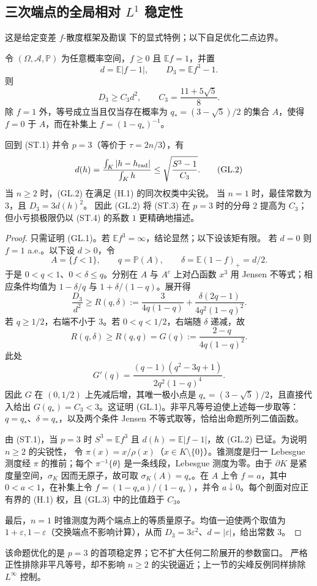 \subsection{三次端点的全局相对 \texorpdfstring{$L^1$}{L1} 稳定性}
\label{subsec:global-l1-cubic}

这是给定变差 $f$-散度框架及勘误
\cite{Gilardoni2006MinimumF,Gilardoni2010Corrigendum}下的显式特例；以下自足优化二点边界。

\begin{proposition}[三次矩的全局常数]\label{prop:global-l1-cubic}
令 $(\Omega,\mathcal A,\mathbb P)$ 为任意概率空间，$f\ge0$ 且
$\mathbb Ef=1$，并置
\[
 d=\mathbb E|f-1|,\qquad D_3=\mathbb Ef^3-1.
\]
则
\[
 D_3\ge C_3d^2,\qquad C_3=\frac{11+5\sqrt5}{8}.\tag{GL.1}
\]
除 $f=1$ 外，等号成立当且仅当存在概率为
\(q_*=(3-\sqrt5)/2\) 的集合 $A$，使得 $f=0$ 于 $A$，而在补集上
\(f=(1-q_*)^{-1}\)。

回到 \textup{(ST.1)} 并令 $p=3$（等价于 $\tau=2n/3$），有
\[
 d(h)=\frac{\int_K|h-h_{\rm rad}|}{\int_Kh}
 \le\sqrt{\frac{S^3-1}{C_3}}.\tag{GL.2}
\]
当 $n\ge2$ 时，\textup{(GL.2)} 在满足 \textup{(H.1)} 的同次权类中尖锐。
当 $n=1$ 时，最佳常数为 $3$，且 $D_3=3d(h)^2$。
因此 \textup{(GL.2)} 将 \textup{(ST.3)} 在 $p=3$ 时的分母 $2$ 提高为 $C_3$；
但小亏损极限仍以 \textup{(ST.4)} 的系数 $1$ 更精确地描述。
\end{proposition}
\begin{proof}
只需证明 \textup{(GL.1)}。若 $\mathbb Ef^3=\infty$，结论显然；以下设该矩有限。
若 $d=0$ 则 $f=1$ a.e.。以下设 $d>0$，令
\[
 A=\{f<1\},\qquad q=\mathbb P(A),\qquad
 \delta=\mathbb E(1-f)_+=d/2.
\]
于是 $0<q<1$、$0<\delta\le q$。分别在 $A$ 与 $A^c$ 上对凸函数 $x^3$ 用
Jensen 不等式；相应条件均值为 $1-\delta/q$ 与 $1+\delta/(1-q)$。展开得
\[
 \frac{D_3}{d^2}\ge R(q,\delta):=
 \frac{3}{4q(1-q)}+
 \frac{\delta(2q-1)}{4q^2(1-q)^2}.\tag{GL.3}
\]
若 $q\ge1/2$，右端不小于 $3$。若 $0<q<1/2$，右端随 $\delta$ 递减，故
\[
 R(q,\delta)\ge R(q,q)=G(q):=\frac{2-q}{4q(1-q)^2}.
\]
此处
\[
 G'(q)=\frac{(q-1)(q^2-3q+1)}{2q^2(1-q)^4}.
\]
因此 $G$ 在 $(0,1/2)$ 上先减后增，其唯一极小点是
\(q_*=(3-\sqrt5)/2\)，且直接代入给出 $G(q_*)=C_3<3$。这证明
\textup{(GL.1)}。非平凡等号迫使上述每一步取等：
$q=q_*$、$\delta=q_*$，以及两个条件 Jensen 不等式取等，恰给出命题所列二值函数。

由 \textup{(ST.1)}，当 $p=3$ 时 $S^3=\mathbb Ef^3$ 且
$d(h)=\mathbb E|f-1|$，故 \textup{(GL.2)} 已证。为说明 $n\ge2$ 的尖锐性，
令 $\pi(x)=x/\rho(x)$（$x\in K\setminus\{0\}$）。锥测度是归一 Lebesgue 测度经
$\pi$ 的推前；每个 $\pi^{-1}\{\theta\}$ 是一条线段，Lebesgue 测度为零。由于
$\partial K$ 是紧度量空间，$\sigma_K$ 因而无原子，故可取
$\sigma_K(A)=q_*$。在 $A$ 上令 $f=a$，其中 $0<a<1$，在补集上令
\(f=(1-q_*a)/(1-q_*)\)，并令 $a\downarrow0$。每个剖面对应正有界的
\textup{(H.1)} 权，且 \textup{(GL.3)} 中的比值趋于 $C_3$。

最后，$n=1$ 时锥测度为两个端点上的等质量原子。均值一迫使两个取值为
$1+\varepsilon,1-\varepsilon$（交换端点不影响计算），从而
$D_3=3\varepsilon^2$、$d=|\varepsilon|$，给出常数 $3$。
\end{proof}

\begin{remark}
该命题优化的是 $p=3$ 的首项稳定界；它不扩大任何二阶展开的参数窗口。
严格正性排除非平凡等号，却不影响 $n\ge2$ 的尖锐逼近；上一节的尖峰反例同样排除 $L^\infty$ 控制。
\end{remark}
